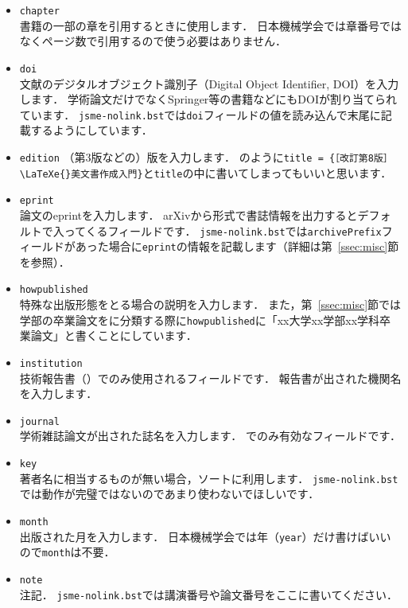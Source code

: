 \documentclass[a4paper,fleqn,uplatex,dvipdfmx]{jsarticle}
\newcommand{\jsmefile}{\texttt{jsme-nolink.bst}}
\begin{document}
\begin{itemize}
    \item \verb|chapter| \\
        書籍の一部の章を引用するときに使用します．
        日本機械学会では章番号ではなくページ数で引用するので使う必要はありません．
    \item \verb|doi| \\
        文献のデジタルオブジェクト識別子（Digital Object Identifier, DOI）を入力します．
        学術論文だけでなくSpringer等の書籍などにもDOIが割り当てられています．
        \jsmefile では\verb|doi|フィールドの値を読み込んで末尾に記載するようにしています．
    \item \verb|edition|
        （第3版などの）版を入力します．
        \citet{奥村:技評2020}のように\verb|title = {［改訂第8版］\LaTeXe{}美文書作成入門}|と\verb|title|の中に書いてしまってもいいと思います．
    \item \verb|eprint| \\
        論文のeprintを入力します．
        arXivから\BibTeX{}形式で書誌情報を出力するとデフォルトで入ってくるフィールドです．
        \jsmefile では\verb|archivePrefix|フィールドがあった場合に\verb|eprint|の情報を記載します（詳細は第~\ref{ssec:misc}節\ttmisc を参照）．
    \item \verb|howpublished| \\
        特殊な出版形態をとる場合の説明を入力します．
        また，第~\ref{ssec:misc}節では学部の卒業論文を\ttmisc に分類する際に\verb|howpublished|に「xx大学xx学部xx学科卒業論文」と書くことにしています．
    \item \verb|institution| \\
        技術報告書（\tttechreport）でのみ使用されるフィールドです．
        報告書が出された機関名を入力します．
    \item \verb|journal| \\
        学術雑誌論文が出された誌名を入力します．
        \ttarticle でのみ有効なフィールドです．
    \item \verb|key| \\
        著者名に相当するものが無い場合，ソートに利用します．
        \jsmefile では動作が完璧ではないのであまり使わないでほしいです．
    \item \verb|month| \\
        出版された月を入力します．
        日本機械学会では年（\verb|year|）だけ書けばいいので\verb|month|は不要．
    \item \verb|note| \\
        注記．
        \jsmefile では講演番号や論文番号をここに書いてください．

\end{itemize}
\end{document}
